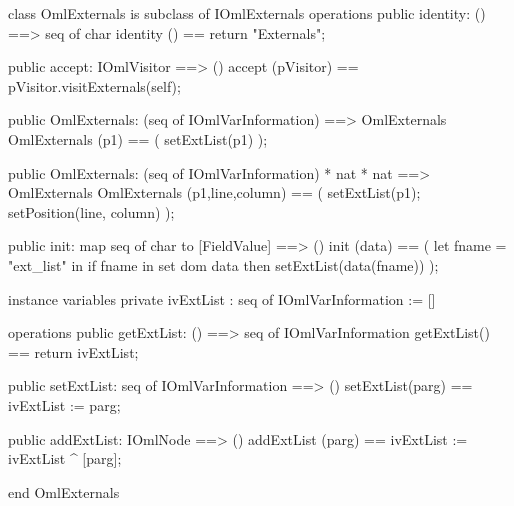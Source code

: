 \begin{vdm_al}
class OmlExternals is subclass of IOmlExternals
operations
  public identity: () ==> seq of char
  identity () == return "Externals";

  public accept: IOmlVisitor ==> ()
  accept (pVisitor) == pVisitor.visitExternals(self);

  public OmlExternals:
    (seq of IOmlVarInformation) ==> OmlExternals
  OmlExternals (p1) == 
    ( setExtList(p1) );

  public OmlExternals:
    (seq of IOmlVarInformation) *
    nat *
    nat ==> OmlExternals
  OmlExternals (p1,line,column) == 
    ( setExtList(p1);
      setPosition(line, column) );

  public init: map seq of char to [FieldValue] ==> ()
  init (data) ==
    ( let fname = "ext_list" in
        if fname in set dom data
        then setExtList(data(fname)) );

instance variables
  private ivExtList : seq of IOmlVarInformation := []

operations
  public getExtList: () ==> seq of IOmlVarInformation
  getExtList() == return ivExtList;

  public setExtList: seq of IOmlVarInformation ==> ()
  setExtList(parg) == ivExtList := parg;

  public addExtList: IOmlNode ==> ()
  addExtList (parg) == ivExtList := ivExtList ^ [parg];

end OmlExternals
\end{vdm_al}

